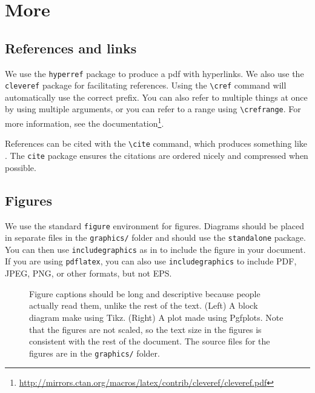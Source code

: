\chapter{More}

\section{References and links}
\label{sec:references}

We use the \verb|hyperref| package to produce a pdf with hyperlinks. We also use the \verb|cleveref| package for facilitating references. Using the \verb|\cref| command will automatically use the correct prefix. You can also refer to multiple things at once by using multiple arguments, or you can refer to a range using \verb|\crefrange|. For more information, see the documentation\footnote{\url{http://mirrors.ctan.org/macros/latex/contrib/cleveref/cleveref.pdf}}.

References can be cited with the \verb|\cite| command, which produces something like \cite{lessard16,lessard2015optimal,sundararajan2020analysis,tmm}. The \verb|cite| package ensures the citations are ordered nicely and compressed when possible.


\section{Figures}

We use the standard \verb|figure| environment for figures. Diagrams should be placed in separate files in the \texttt{graphics/} folder and should use the \texttt{standalone} package. You can then use \verb|includegraphics| as in  to include the figure in your document. If you are using \verb|pdflatex|, you can also use \verb|includegraphics| to include PDF, JPEG, PNG, or other formats, but not EPS.

\begin{figure}[htb]
	\centering
	\caption{Figure captions should be long and descriptive because people actually read them, unlike the rest of the text. (Left) A block diagram make using Tikz. (Right) A plot made using Pgfplots. Note that the figures are not scaled, so the text size in the figures is consistent with the rest of the document. The source files for the figures are in the \texttt{graphics/} folder.}
  \label{fig:sample}
\end{figure}

